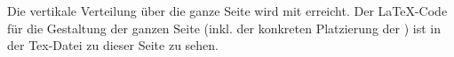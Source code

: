 \vfill

Die vertikale Verteilung über die ganze Seite wird mit  erreicht. Der \LaTeX-Code für die Gestaltung der ganzen Seite (inkl. der konkreten Platzierung der ) ist in der Tex-Datei zu dieser Seite  zu sehen.

